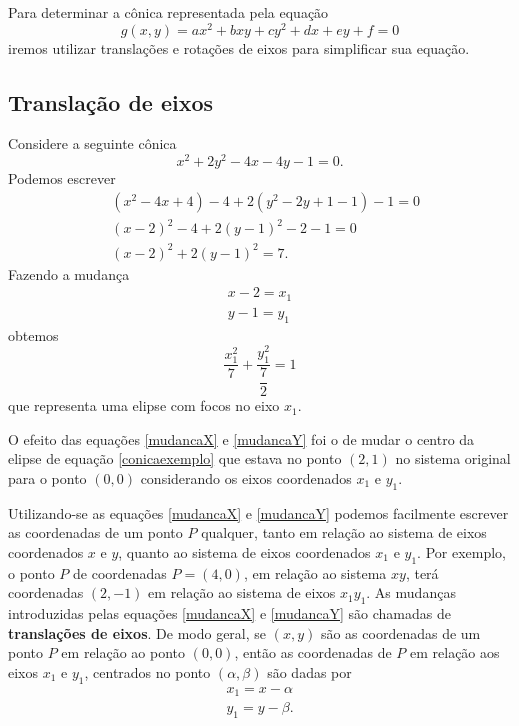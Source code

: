 Para determinar a cônica representada pela equação
\[
    g(x, y) = ax^2 + bxy + cy^2 + dx + ey + f = 0
\]
iremos utilizar translações e rotações de eixos para simplificar sua equação.

\subsection{Translação de eixos}

Considere a seguinte cônica
\begin{equation}\label{conicaexemplo}
    x^2 + 2y^2 - 4x - 4y - 1 = 0.
\end{equation}
Podemos escrever
\begin{align*}
     & (x^2 - 4x + 4) - 4 + 2(y^2 - 2y + 1 - 1) - 1 = 0 \\
     & (x - 2)^2 - 4 + 2(y - 1)^2 - 2 - 1 = 0           \\
     & (x - 2)^2 + 2(y - 1)^2 = 7.
\end{align*}
Fazendo a mudança
\begin{align}
    x - 2 = x_1\label{mudancaX} \\
    y - 1 = y_1\label{mudancaY}
\end{align}
obtemos
\[
    \dfrac{x_1^2}{7} + \dfrac{y_1^2}{\dfrac{7}{2}} = 1
\]
que representa uma elipse com focos no eixo $x_1$.

O efeito das equações \eqref{mudancaX} e \eqref{mudancaY} foi o de mudar o centro da elipse de equação \eqref{conicaexemplo} que estava no ponto $(2,1)$ no
sistema original para o ponto $(0,0)$ considerando os eixos coordenados $x_1$ e $y_1$.

Utilizando-se as equações \eqref{mudancaX} e \eqref{mudancaY} podemos facilmente escrever as coordenadas de um ponto $P$ qualquer, tanto em relação ao
sistema de eixos coordenados $x$ e $y$, quanto ao sistema de eixos coordenados $x_1$ e $y_1$. Por exemplo, o ponto $P$ de coordenadas $P = (4,0)$, em
relação ao sistema $xy$, terá coordenadas $(2,-1)$ em relação ao sistema de eixos $x_1y_1$. As mudanças introduzidas pelas equações \eqref{mudancaX} e
\eqref{mudancaY} são chamadas de \textbf{translações de eixos}. De modo geral, se $(x,y)$ são as coordenadas de um ponto $P$ em relação ao ponto $(0,0)$,
então as coordenadas de $P$ em relação aos eixos $x_1$ e $y_1$, centrados no ponto $(\alpha,\beta)$ são dadas por
\begin{align}
    x_1 = x - \alpha\label{mudancaXgeral} \\
    y_1 = y - \beta\label{mudancaYgeral}.
\end{align}

